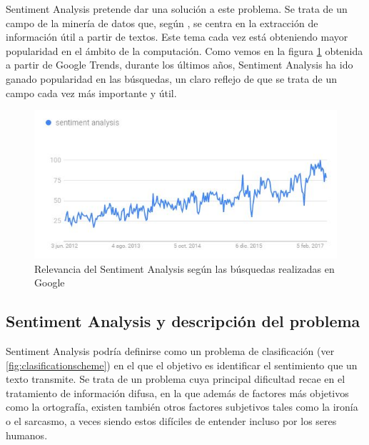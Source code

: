 \documentclass{article}
\begin{document}
	Sentiment Analysis pretende dar una solución a este problema.  Se trata de un campo de la minería de datos que, según \cite{tanetal}, se centra en la extracción de información útil a partir de textos. Este tema cada vez está obteniendo mayor popularidad en el ámbito de la computación. Como vemos en la figura \ref{fig:relevancia} obtenida a partir de Google Trends, durante los últimos años, Sentiment Analysis ha ido ganado popularidad en las búsquedas, un claro reflejo de que se trata de un campo cada vez más importante y útil.
\begin{figure}[h]
	\centering
	\includegraphics[width=0.7\linewidth]{relevancia}
	\caption{Relevancia del Sentiment Analysis según las búsquedas realizadas en Google}
	\label{fig:relevancia}
\end{figure}
\newpage
\subsection{Sentiment Analysis y descripción del problema}
Sentiment Analysis podría definirse como un problema de clasificación (ver \ref{fig:clasificationscheme}) en el que el objetivo es identificar el sentimiento que un texto transmite. Se trata de un problema cuya principal dificultad recae en el tratamiento de información difusa, en la que además de factores más objetivos como la ortografía, existen también otros factores subjetivos tales como la ironía o el sarcasmo, a veces siendo estos difíciles de entender incluso por los seres humanos.
\end{document}
